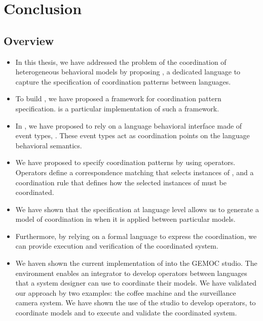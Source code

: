 \chapter{Conclusion}
\label{ch:conclusions}

\section{Overview}

\begin{itemize}
		
	\item In this thesis, we have addressed the problem of the coordination of heterogeneous behavioral models by proposing \bcool, a dedicated language to capture the specification of coordination patterns between languages. 
	
	
	\item To build \bcool, we have proposed a framework for coordination pattern specification. \bcool is a particular implementation of such a framework.
	
	\item In \bcool, we have proposed to rely on a language behavioral interface made of event types, \ie \dse. These event types act as coordination points on the language behavioral semantics. 
	
	\item We have proposed to specify coordination patterns by using operators. Operators define a correspondence matching that selects instances of \dse, and a coordination rule that defines how the selected instances of \dse must be coordinated.  

	\item We have shown that the specification at language level allows us to generate a model of coordination in \ccsl when it is applied between particular models. 
	
	\item Furthermore, by relying on a formal language to express the coordination, we can provide execution and verification of the coordinated system.   
	
	\item We haven shown the current implementation of \bcool into the GEMOC studio. The environment enables an integrator to develop operators between languages that a system designer can use to coordinate their models. We have validated our approach by two examples: the coffee machine and the surveillance camera system. We have shown the use of the studio to develop operators, to coordinate models and to execute and validate the coordinated system. 
	  

	
\end{itemize}
